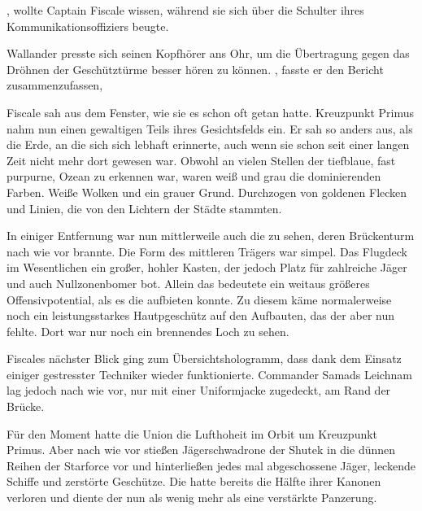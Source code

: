 , wollte Captain Fiscale wissen, während sie sich über die Schulter ihres Kommunikationsoffiziers beugte.

\par

Wallander presste sich seinen Kopfhörer ans Ohr, um die Übertragung gegen das Dröhnen der Geschütztürme besser hören zu können. , fasste er den Bericht zusammenzufassen, 

\par

Fiscale sah aus dem Fenster, wie sie es schon oft getan hatte. Kreuzpunkt Primus nahm nun einen gewaltigen Teils ihres Gesichtsfelds ein. Er sah so anders aus, als die Erde, an die sich sich lebhaft erinnerte, auch wenn sie schon seit einer langen Zeit nicht mehr dort gewesen war. Obwohl an vielen Stellen der tiefblaue, fast purpurne, Ozean zu erkennen war, waren weiß und grau die dominierenden Farben. Weiße Wolken und ein grauer Grund. Durchzogen von goldenen Flecken und Linien, die von den Lichtern der Städte stammten.

\par

In einiger Entfernung war nun mittlerweile auch die  zu sehen, deren Brückenturm nach wie vor brannte. Die Form des mittleren Trägers war simpel. Das Flugdeck im Wesentlichen ein großer, hohler Kasten, der jedoch Platz für zahlreiche Jäger und auch Nullzonenbomer bot. Allein das bedeutete ein weitaus größeres Offensivpotential, als es die  aufbieten konnte. Zu diesem käme normalerweise noch ein leistungsstarkes Hautpgeschütz auf den Aufbauten, das der  aber nun fehlte. Dort war nur noch ein brennendes Loch zu sehen.

\par

Fiscales nächster Blick ging zum Übersichtshologramm, dass dank dem Einsatz einiger gestresster Techniker wieder funktionierte. Commander Samads Leichnam lag jedoch nach wie vor, nur mit einer Uniformjacke zugedeckt, am Rand der Brücke.

\par

Für den Moment hatte die Union die Lufthoheit im Orbit um Kreuzpunkt Primus. Aber nach wie vor stießen Jägerschwadrone der Shutek in die dünnen Reihen der Starforce vor und hinterließen jedes mal abgeschossene Jäger, leckende Schiffe und zerstörte Geschütze. Die  hatte bereits die Hälfte ihrer Kanonen verloren und diente der  nun als wenig mehr als eine verstärkte Panzerung.

